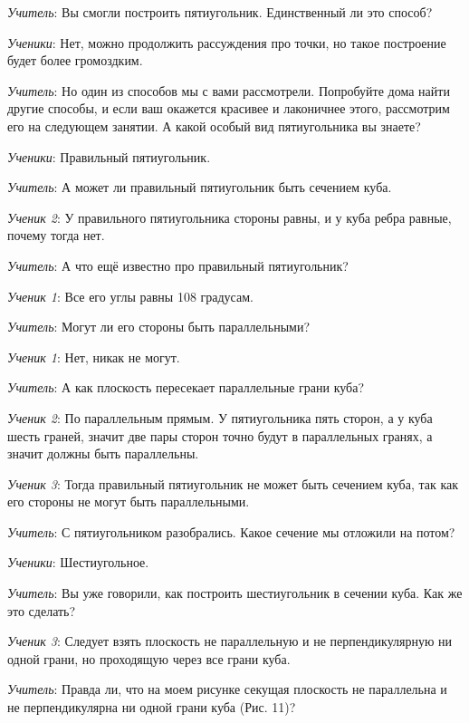 \documentclass[a4paper,14pt,russian]{extreport}
\newcommand{\capt}[1]{%
    \\[8pt]
    \text{Рис. #1}
}
\begin{document}
\textit{Учитель}: Вы смогли построить пятиугольник. Единственный ли это способ?

\textit{Ученики}: Нет, можно продолжить рассуждения про точки, но такое построение будет более громоздким.

\textit{Учитель}: Но один из способов мы с вами рассмотрели. Попробуйте дома найти другие способы, и если ваш окажется красивее и лаконичнее этого, рассмотрим его на следующем занятии. А какой особый вид пятиугольника вы знаете?

\textit{Ученики}: Правильный пятиугольник. 

\textit{Учитель}: А может ли правильный пятиугольник быть сечением куба.

\textit{Ученик 2}: У правильного пятиугольника стороны равны, и у куба ребра равные, почему тогда нет.

\textit{Учитель}: А что ещё известно про правильный пятиугольник?

\textit{Ученик 1}: Все его углы равны 108 градусам.

\textit{Учитель}: Могут ли его стороны быть параллельными?

\textit{Ученик 1}: Нет, никак не могут.

\textit{Учитель}: А как плоскость пересекает параллельные грани куба?

\textit{Ученик 2}: По параллельным прямым. У пятиугольника пять сторон, а у куба шесть граней, значит две пары сторон точно будут в параллельных гранях, а значит должны быть параллельны.

\textit{Ученик 3}: Тогда правильный пятиугольник не может быть сечением куба, так как его стороны не могут быть параллельными.

\textit{Учитель}: С пятиугольником разобрались. Какое сечение мы отложили на потом?

\textit{Ученики}: Шестиугольное.

\textit{Учитель}: Вы уже говорили, как построить шестиугольник в сечении куба. Как же это сделать?

\textit{Ученик 3}: Следует взять плоскость не параллельную и не перпендикулярную ни одной грани, но проходящую через все грани куба.

\textit{Учитель}: Правда ли, что на моем рисунке секущая плоскость не параллельна и не перпендикулярна ни одной грани куба (Рис. 11)?

\begin{center}
    \begin{minipage}{0.3\textwidth}
        \centering
    \end{minipage}
    \capt{11}
\end{center}
\end{document}
